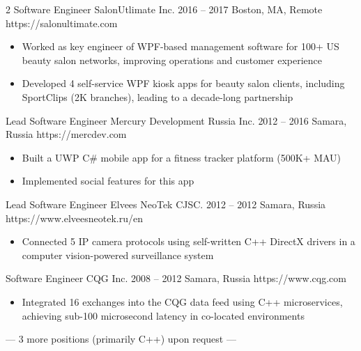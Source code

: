 \documentclass[9pt,a4paper]{igrmkcv}
\begin{document}
\begin{paracol}{2}
    \cvLeftEvent
        {Software Engineer}
        {SalonUtlimate Inc.}
        {2016 -- 2017}
        {Boston, MA, Remote}
        {https://salonultimate.com}

        \begin{itemize}
            \item Worked as key engineer of WPF-based management software
                  for 100+ US beauty salon networks, improving operations and customer experience
            \item Developed 4 self-service WPF kiosk apps for beauty salon clients,
                  including SportClips (2K branches), leading to a decade-long partnership
        \end{itemize}

    \cvLeftEvent
        {Lead Software Engineer}
        {Mercury Development Russia Inc.}
        {2012 -- 2016}
        {Samara, Russia}
        {https://mercdev.com}

        \begin{itemize}
            \item Built a UWP C\# mobile app for a fitness tracker platform (500K+ MAU)
            \item Implemented social features for this app
        \end{itemize}

    \cvLeftEvent
        {Lead Software Engineer}
        {Elvees NeoTek CJSC.}
        {2012 -- 2012}
        {Samara, Russia}
        {https://www.elveesneotek.ru/en}

        \begin{itemize}
            \item Connected 5 IP camera protocols using self-written C++ DirectX drivers
                  in a computer vision-powered surveillance system
        \end{itemize}

    \cvLeftEvent
        {Software Engineer}
        {CQG Inc.}
        {2008 -- 2012}
        {Samara, Russia}
        {https://www.cqg.com}

        \begin{itemize}
            \item Integrated 16 exchanges into the CQG data feed using C++ microservices,
                  achieving sub-100 microsecond latency in co-located environments
        \end{itemize}

        {
            \vspace{6pt}
            \centering
            \footnotesize
            \color{secondaryTextColor}
            --- 3 more positions (primarily C++) upon request ---
            \par
        }


\end{paracol}
\end{document}
